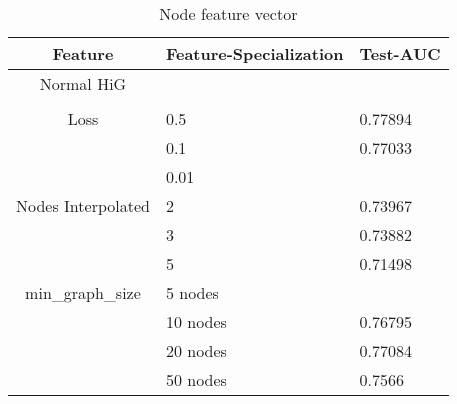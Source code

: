 \begin{table}
    \centering
    \caption{Node feature vector}
    \label{node_features}
    \begin{tabular}{c || l| p{6cm} |}
        Feature & Feature-Specialization& Test-AUC                                                 \\
        \hline
        \hline
        Normal HiG&   &        \\
	\hline                                               \\
        Loss & 0.5 & 0.77894 \\
             & 0.1 & 0.77033                                               \\
             & 0.01 &                                                \\
	\hline
        Nodes Interpolated & 2             & 0.73967                                                 \\
             & 3            & 0.73882                                                  \\
             & 5                 & 0.71498                              \\
	\hline
            min_graph_size & 5 nodes                   &                                                   \\
             & 10 nodes                   & 0.76795    \\
             & 20 nodes                   & 0.77084    \\
             & 50 nodes                   & 0.7566                                                  \\
    \end{tabular}
\end{table}
